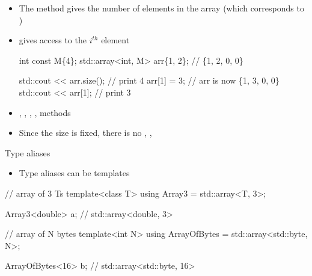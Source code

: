 \begin{frame}[fragile]{ \insertcontinuationtext}

  \begin{itemize}
  \item The  method gives the number of elements in the array (which
    corresponds to )
  \item {} gives access to the $i^{th}$ element
    \begin{codeblock}
int const M\{4\};
std::array<int, M> arr\{1, 2\}; // \{1, 2, 0, 0\}

std::cout << arr.size(); // print 4
arr[1] = 3;              // arr is now \{1, 3, 0, 0\}
std::cout << arr[1];     // print 3\end{codeblock}

  \item {}, , , ,  methods
  \item Since the size is fixed, there is no , ,
  \end{itemize}

\end{frame}

\begin{frame}[fragile]{Type aliases \insertcontinuationtext}

  \begin{itemize}
  \item Type aliases can be templates
  \end{itemize}

  \begin{codeblock}
// array of 3 Ts
template<class \alert{T}> using Array3 = std::array<\alert{T}, 3>;

Array3<\alert{double}> a; // std::array<double, 3>\end{codeblock}

  \begin{codeblock}
// array of N bytes
template<int \alert{N}> using ArrayOfBytes = std::array<std::byte, \alert{N}>;

ArrayOfBytes<\alert{16}> b; // std::array<std::byte, 16>\end{codeblock}
\end{frame}

